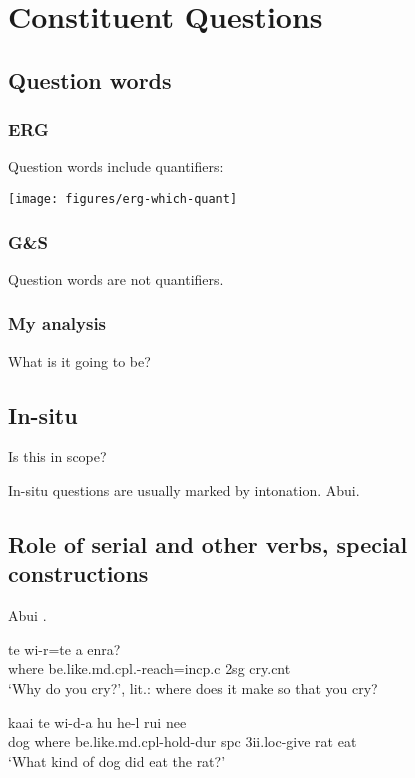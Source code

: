 \documentclass [11pt, proquest] {uwthesis}[2016/11/22]
\begin{document}

\chapter{Constituent Questions}

\section{Question words}
\subsection{ERG}
Question words include quantifiers:

\texttt{[image: figures/erg-which-quant]}

\subsection{G\&S}
Question words are not quantifiers.

\subsection{My analysis}
What is it going to be?

\section{In-situ}
Is this in scope?

In-situ questions are usually marked by intonation. Abui. 

\section{Role of serial and other verbs, special constructions}

Abui \citep{kratochvil2007grammar}.

\begin{exe}
\ex \gll  te wi-r=te a enra? \\
where be.like.{\sc md.cpl.}-reach={\sc incp.c} {\sc 2sg} cry.{\sc cnt} \\
`Why do you cry?', lit.: where does it make so that you cry?
\end{exe}

\begin{exe}
\ex \gll kaai te wi-d-a hu he-l rui nee \\
dog where be.like.{\sc md.cpl}-hold-{\sc dur} {\sc spc} {\sc 3ii.loc}-give rat eat\\
`What kind of dog did eat the rat?'
\end{exe}
\end{document}
